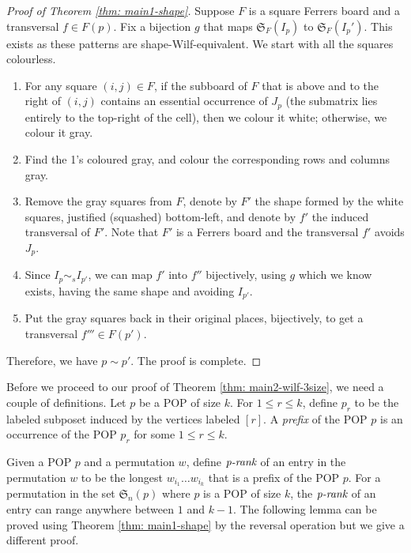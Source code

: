 \documentclass[12pt, english, a4paper]{article}
\newcommand{\Av}{\mathfrak{S}}
\theoremstyle{plain}
\theoremstyle{definition}
\theoremstyle{remark}
\begin{document}
\begin{proof}[Proof of Theorem \ref{thm: main1-shape}]
Suppose $F$ is a square Ferrers board and a transversal $f\in F(p)$. Fix a bijection $g$ that maps $\Av_F(I_p)$ to $\Av_F(I_p')$. This exists as these patterns are shape-Wilf-equivalent. We start with all the squares colourless. 
\begin{enumerate}
\item For any square $(i,j)\in F$, if the subboard of $F$ that is above and to the right of $(i,j)$ contains an essential occurrence of $J_p$ (the submatrix lies entirely to the top-right of the cell), then we colour it white; otherwise, we colour it gray.

\item Find the 1's coloured gray, and colour the corresponding rows and columns gray.

\item  Remove the gray squares from $F$, denote by $F'$ the shape formed by the white squares, justified (squashed) bottom-left, and denote by $f'$ the induced transversal of $F'$. Note that $F'$ is a Ferrers board and the transversal $f'$ avoids $J_p$.  

\item Since $I_p \sim_s I_{p'}$, we can map $f'$ into $f''$ bijectively, using $g$ which we know exists, having the same shape and avoiding $I_{p'}$. 

\item Put the gray squares back in their original places, bijectively, to get a transversal
$f'''\in F(p')$.
\end{enumerate}
Therefore, we have $p\sim p'$.  The proof is complete.
\end{proof}

Before we proceed to our proof of Theorem \ref{thm: main2-wilf-3size}, we 
need a couple of definitions. Let $p$ be a POP of size $k$. 
For $1\le r\le k$, define $p_r$ to be the labeled subposet induced by the vertices labeled $[r]$. A \emph{prefix} of the POP $p$ is an occurrence of the POP $p_r$ for some $1\le r\le k$. 

Given a POP $p$ and a permutation $w$, define $\emph{p-rank}$ of an entry in the permutation $w$ to be the longest $w_{i_1}\dots w_{i_k}$ that is a prefix of the POP $p$. For a permutation in the set $\Av_n(p)$ where $p$ is a POP of size $k$, the $\emph{p-rank}$ of an entry can range anywhere between $1$ and $k-1$.
The following lemma can be proved using Theorem \ref{thm: main1-shape} by the reversal operation but we give a different proof.
\end{document}

